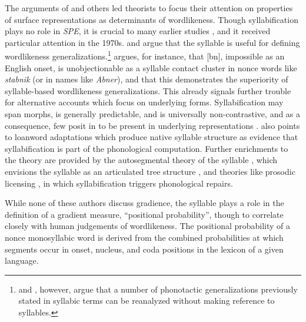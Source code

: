 The arguments of \citeauthor{Shibatani1973} and others led theorists to focus their attention on properties of surface representations as determinants of wordlikeness. Though syllabification plays no role in \emph{SPE}, it is crucial to many earlier studies \citep[for a review, see][]{Goldsmith2011b}, and it received particular attention in the 1970s. \citet{Hooper1973} and \citet{Kahn1976} argue that the syllable is useful for defining wordlikeness generalizations.\footnote{\citet{Steriade1999} and \citet{Blevins2003}, however, argue that a number of phonotactic generalizations previously stated in syllabic terms can be reanalyzed without making reference to syllables.} \citeauthor{Hooper1973} argues, for instance, that [bn], impossible as an English onset, is unobjectionable as a syllable contact cluster in nonce words like \emph{stabnik} (or in names like \emph{Abner}), and that this demonstrates the superiority of syllable-based wordlikeness generalizations. This already signals further trouble for alternative accounts which focus on underlying forms. Syllabification may span morphs, is generally predictable, and is universally non-contrastive, and as a consequence, few posit in to be present in underlying representations \citep[though see, e.g.,][]{Vaux2003}. \citeauthor{Hooper1973} also points to loanword adaptations which produce native syllable structure \citep[e.g.,][]{Carlisle1991} as evidence that syllabification is part of the phonological computation. Further enrichments to the theory are provided by the autosegmental theory of the syllable \citep{McCarthy1979b}, which envisions the syllable as an articulated tree structure \citep[as first envisioned by][]{Pike1947a}, and theories like prosodic licensing \citep{Ito1989a}, in which syllabification triggers phonological repairs.

While none of these authors discuss gradience, the syllable plays a role in the definition of a gradient measure, ``positional probability'', though to correlate closely with human judgements of wordlikeness. The positional probability of a nonce monosyllabic word is derived from the combined probabilities at which segments occur in onset, nucleus, and coda positions in the lexicon of a given language. 
